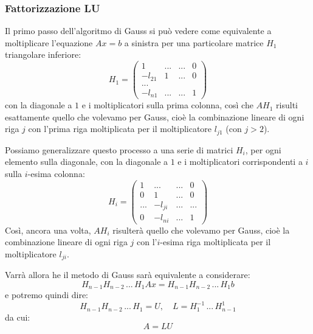 \documentclass[a4paper,11pt]{article}
\begin{document}
\subsubsection{Fattorizzazione LU}
Il primo passo dell'algoritmo di Gauss si può vedere come equivalente a moltiplicare l'equazione $Ax = b$ a sinistra per una particolare matrice $H_1$ triangolare inferiore:
$$
H_1 = \begin{pmatrix}
	1 & ... & ... & 0 \\
	-l_{21} & 1 & ... & 0 \\
	... \\ 
	-l_{n1} & ... & ... & 1
\end{pmatrix}
$$
con la diagonale a $1$ e i moltiplicatori sulla prima colonna, così che $A H_1$ risulti esattamente quello che volevamo per Gauss, cioè la combinazione lineare di ogni riga $j$ con l'prima riga moltiplicata per il moltiplicatore $l_{j1}$ (con $j > 2$).

Possiamo generalizzare questo processo a una serie di matrici $H_i$, per ogni elemento sulla diagonale, con la diagonale a $1$ e i moltiplicatori corrispondenti a $i$ sulla $i$-esima colonna:
$$
H_i = \begin{pmatrix}
	1 & ... & ... & 0 \\
	0 & 1 & ... & 0 \\
	... & -l_{ji} & ... & ... \\
	0 & -l_{ni} & ... & 1
\end{pmatrix}
$$
Così, ancora una volta, $A H_i$ risulterà quello che volevamo per Gauss, cioè la combinazione lineare di ogni riga $j$ con l'$i$-esima riga moltiplicata per il moltiplicatore $l_{ji}$.

Varrà allora he il metodo di Gauss sarà equivalente a considerare:
$$
H_{n - 1} H_{n - 2} \, ... \, H_1 A x = H_{n - 1} H_{n - 2} \, ... \, H_1 b
$$
e potremo quindi dire:
$$
H_{n - 1} H_{n - 2} \, ... \, H_1 = U, \quad L = H_1^{-1} \, ... \, H_{n - 1}^1 
$$
da cui:
$$
A = LU
$$
\end{document}
